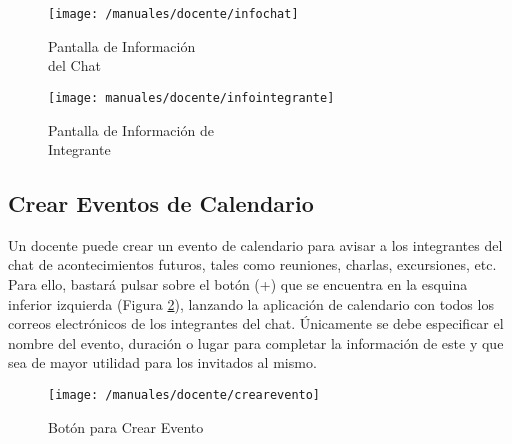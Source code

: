 \begin{figure}[!h]
	\centering
	\begin{minipage}{.5\textwidth}
		\centering
		\texttt{[image: /manuales/docente/infochat]}
		\caption{Pantalla de Información \\ del Chat}
		\label{fig:infochatdocente}
	\end{minipage}%
	\begin{minipage}{.5\textwidth}
		\centering
		\texttt{[image: manuales/docente/infointegrante]}
		\caption{Pantalla de Información de \\ Integrante}
		\label{fig:infointegrantedocente}
	\end{minipage}
\end{figure}

\clearpage

\subsection*{Crear Eventos de Calendario}
Un docente puede crear un evento de calendario para avisar a los integrantes del chat de acontecimientos futuros, tales como reuniones, charlas, excursiones, etc. Para ello, bastará pulsar sobre el botón (+) que se encuentra en la esquina inferior izquierda (Figura \ref{fig:creareventodocente}), lanzando la aplicación de calendario con todos los correos electrónicos de los integrantes del chat. Únicamente se debe especificar el nombre del evento, duración o lugar para completar la información de este y que sea de mayor utilidad para los invitados al mismo.

\begin{figure}[!h]
	\begin{center}
		\texttt{[image: /manuales/docente/crearevento]}
		\caption{Botón para Crear Evento}
		\label{fig:creareventodocente}
	\end{center}
\end{figure}



